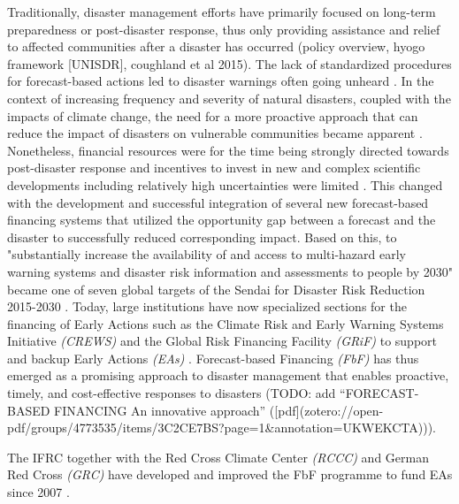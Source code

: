 Traditionally, disaster management efforts have primarily focused on long-term preparedness or post-disaster response, thus only providing assistance and relief to affected communities after a disaster has occurred (policy overview, hyogo framework [UNISDR], coughland et al 2015). The lack of standardized procedures for forecast-based actions led to disaster warnings often going unheard \autocite{kolenImpactsStormXynthia2013}. In the context of increasing frequency and severity of natural disasters, coupled with the impacts of climate change, the need for a more proactive approach that can reduce the impact of disasters on vulnerable communities became apparent \autocite{coughlandeperezForecastbasedFinancingApproach2015,trisosAfrica2022}. Nonetheless, financial resources were for the time being strongly directed towards post-disaster response and incentives to invest in new and complex scientific developments including relatively high uncertainties were limited \autocite{coughlandeperezActionbasedFloodForecasting2016}. This changed with the development and successful integration of several new forecast-based financing systems that utilized the opportunity gap between a forecast and the disaster to successfully reduced corresponding impact. Based on this, to "substantially increase the availability of and access to multi-hazard early warning systems and disaster risk information and assessments to people by 2030" became one of seven global targets of the Sendai for Disaster Risk Reduction 2015-2030 \autocites{coughlandeperezActionbasedFloodForecasting2016}[12]{undrrSendaiFrameworkDisaster}. Today, large institutions have now specialized sections for the financing of Early Actions such as the Climate Risk and Early Warning Systems Initiative \textit{(CREWS)} and the Global Risk Financing Facility \textit{(GRiF)} to support and backup Early Actions \textit{(EAs)} \autocite{crewsClimateRiskEarly,GlobalRiskFinancing}. Forecast-based Financing \textit{(FbF)} has thus emerged as a promising approach to disaster management that enables proactive, timely, and cost-effective responses to disasters \autocite{coughlandeperezForecastbasedFinancingApproach2015} (TODO: add “FORECAST-BASED FINANCING An innovative approach” ([pdf](zotero://open-pdf/groups/4773535/items/3C2CE7BS?page=1&annotation=UKWEKCTA))).

The IFRC together with the Red Cross Climate Center \textit{(RCCC)} and German Red Cross \textit{(GRC)} have developed and improved the FbF programme to fund EAs since 2007 \autocite{ifrcForecastbasedFinancingNew2019}. 


